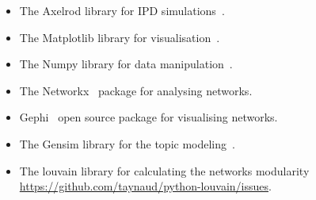 \documentclass{article}
\theoremstyle{definition}
\begin{document}
\begin{itemize}
    \item The Axelrod library for IPD simulations~\cite{axelrodproject}.
    \item The Matplotlib library for visualisation~\cite{hunter2007matplotlib}.
    \item The Numpy library for data manipulation~\cite{walt2011numpy}.
    \item The Networkx~\cite{networkx} package for analysing networks.
    \item Gephi~\cite{ICWSM09154} open source package for visualising networks.
    \item The Gensim library for the topic modeling~\cite{rehurek_lrec}.
    \item The louvain library for calculating the networks modularity \url{https://github.com/taynaud/python-louvain/issues}.
\end{itemize}



\end{document}
